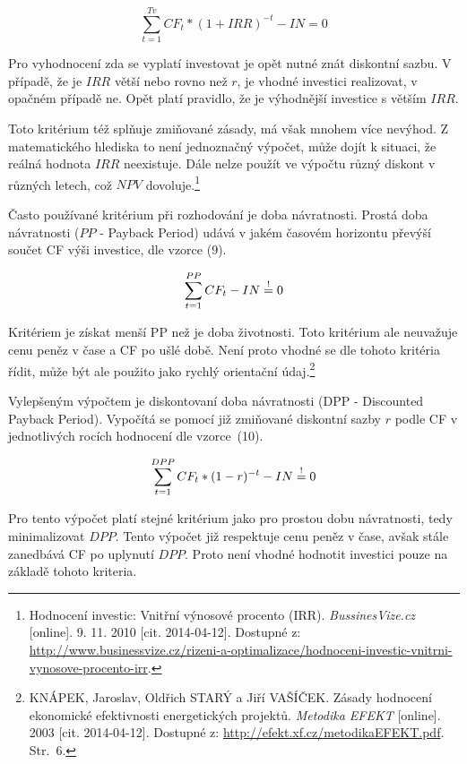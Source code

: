 \documentclass[11pt,a4paper]{article}
\def\excleq{\buildrel!\over=}
\begin{document}
\begin{equation}
\sum_{t=1}^{Tv} CF_{t} * (1 + IRR)^{-t} - IN = 0
\end{equation}

Pro vyhodnocení zda se vyplatí investovat je opět nutné znát diskontní sazbu. V případě, že je $IRR$ větší nebo rovno než $r$, je vhodné investici realizovat, v opačném případě ne. Opět platí pravidlo, že je výhodnější investice s větším $IRR$.

Toto kritérium též splňuje zmiňované zásady, má však mnohem více nevýhod. Z matematického hlediska to není jednoznačný výpočet, může dojít k situaci, že reálná hodnota $IRR$ neexistuje. Dále nelze použít ve výpočtu různý diskont v různých letech, což $NPV$ dovoluje.\footnote{Hodnocení investic: Vnitřní výnosové procento (IRR).  \textit{BussinesVize.cz} [online]. 9. 11. 2010 [cit. 2014-04-12]. Dostupné z: \url{http://www.businessvize.cz/rizeni-a-optimalizace/hodnoceni-investic-vnitrni-vynosove-procento-irr}.}

Často používané kritérium při rozhodování je doba návratnosti. Prostá doba návratnosti ($PP$ - Payback Period) udává v jakém časovém horizontu převýší součet CF výši investice, dle vzorce (9).

\begin{equation}
\sum_{t=1}^{PP} CF_{t} - IN \excleq 0
\end{equation}

Kritériem je získat menší PP než je doba životnosti. Toto kritérium ale neuvažuje cenu peněz v čase a CF po ušlé době. Není proto vhodné se dle tohoto kritéria řídit, může být ale použito jako rychlý orientační údaj.\footnote{KNÁPEK, Jaroslav, Oldřich STARÝ a Jiří VAŠÍČEK. Zásady hodnocení ekonomické efektivnosti energetických projektů. \textit{Metodika EFEKT} [online]. 2003 [cit. 2014-04-12]. Dostupné z: \url{http://efekt.xf.cz/metodikaEFEKT.pdf}. Str.~6.}

Vylepšeným výpočtem je diskontovaní doba návratnosti (DPP - Discounted Payback Period). Vypočítá se pomocí již zmiňované diskontní sazby $r$ podle CF v jednotlivých rocích hodnocení dle vzorce~(10).

\begin{equation}
\sum_{t=1}^{DPP} CF_{t} * (1 - r)^{-t} - IN \excleq 0
\end{equation}

Pro tento výpočet platí stejné kritérium jako pro prostou dobu návratnosti, tedy minimalizovat $DPP$. Tento výpočet již respektuje cenu peněz v čase, avšak stále zanedbává CF po uplynutí $DPP$. Proto není vhodné hodnotit investici pouze na základě tohoto kriteria. 
\end{document}
